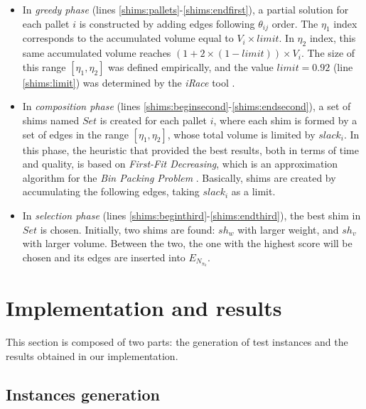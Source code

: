\documentclass[preprint]{elsarticle}
\begin{document}
	
\begin{itemize}
	
	\item In {\it greedy phase}\/ (lines \ref{shims:pallets}-\ref{shims:endfirst}), a partial solution for each pallet $i$\/ is constructed by adding edges following $\theta_{ij}$\/ order. The $\eta_1$\/ index corresponds to the accumulated volume equal to $V_i \times limit$. In $\eta_2$\/ index, this same accumulated volume reaches $(1 + 2\times(1 - limit))\times V_i$. The size of this range $[\eta_1,\eta_2]$\/ was defined empirically, and the value $limit=0.92$\/ (line \ref{shims:limit}) was determined by the {\it iRace} tool \cite{LopezIbanezManuel2016}.
	
	\item In {\it composition phase}\/ (lines \ref{shims:beginsecond}-\ref{shims:endsecond}), a set of shims named $Set$\/ is created for each pallet $i$, where each shim is formed by a set of edges in the range $[\eta_1,\eta_2]$, whose total volume is limited by $slack_i$. In this phase, the heuristic that provided the best results, both in terms of time and quality, is based on {\it First-Fit Decreasing}, which is an approximation algorithm for the {\it Bin Packing Problem}\/ \cite{JohnsonGarey1985}. Basically, shims are created by accumulating the following edges, taking $slack_i$\/ as a limit.
	
	\item In {\it selection phase}\/ (lines \ref{shims:beginthird}-\ref{shims:endthird}), the best shim in $Set$\/ is chosen. Initially, two shims are found: $sh_w$\/ with larger weight, and $sh_v$\/ with larger volume. Between the two, the one with the highest score will be chosen and its edges are inserted into $E_{N_{\pi_k}}$.
	
\end{itemize}



\section{Implementation and results}
\label{sec6}

This section is composed of two parts: the generation of test instances and the results obtained in our implementation.


\subsection{Instances generation}
\label{items}
\end{document}
